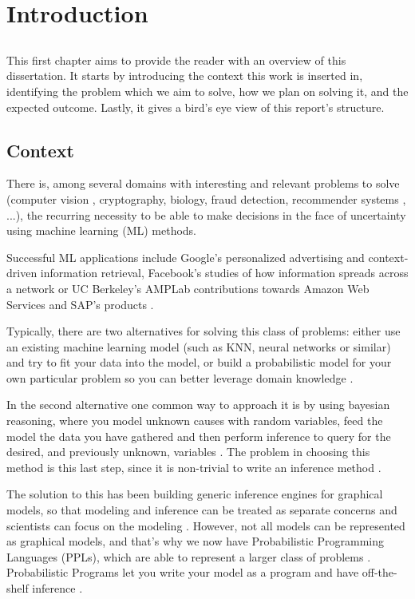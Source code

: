 \chapter{Introduction} \label{chap:intro}

\section*{}

This first chapter aims to provide the reader with an overview of this
dissertation. It starts by introducing the context this work is inserted in,
identifying the problem which we aim to solve, how we plan on solving it, and
the expected outcome. Lastly, it gives a bird's eye view of this report's
structure.

\section{Context} \label{sec:context}

There is, among several domains with interesting and relevant problems to solve
(computer vision \cite{Kulkarni2015}, cryptography, biology, fraud detection,
recommender systems \cite{intml}, ...), the recurring necessity to be able to
make decisions in the face of uncertainty using machine learning (ML) methods.

Successful ML applications include Google's personalized advertising and
context-driven information retrieval, Facebook's studies of how information
spreads across a network or UC Berkeley's AMPLab contributions towards Amazon
Web Services and SAP's products \cite{Broder:2015:BDN:2684822.2697027}.

Typically, there are two alternatives for solving this class of problems: either use an
existing machine learning model (such as KNN, neural networks or similar) \cite{mlnot} and
try to fit your data into the model, or build a probabilistic model for your
own particular problem so you can better leverage domain knowledge \cite{SciPy}.

In the second alternative one common way to approach it is by using bayesian reasoning,
where you model unknown causes with random variables, feed the model the data you
have gathered and then perform inference to query for the
desired, and previously unknown, variables \cite{thbay}. The problem in choosing
this method is this last step, since it is non-trivial
to write an inference method \cite{Duvenaud}.

The solution to this has been building generic inference engines for graphical
models, so that modeling and inference can be treated as separate concerns and
scientists can focus on the modeling \cite{Jordan1996}. However, not all models can be represented as
graphical models, and that’s why we now have Probabilistic Programming Languages
(PPLs), which are able to represent a larger class of problems \cite{intpp}.
Probabilistic Programs let you write your model as a program and have
off-the-shelf inference \cite{Prekopa2003}.

